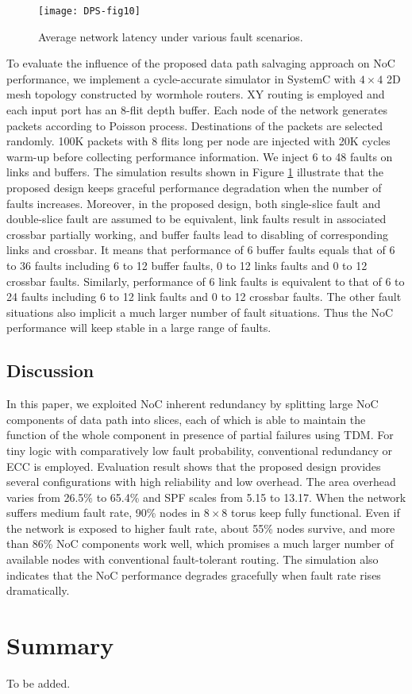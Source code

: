 \begin{figure}[h]
      \centering
        \texttt{[image: DPS-fig10]}
        \caption{Average network latency under various fault scenarios.}
        \label{fig:dps-fig10}
\end{figure}

To evaluate the influence of the proposed data path salvaging approach on NoC performance, we implement a cycle-accurate simulator in SystemC with $4 \times 4$ 2D mesh topology constructed by wormhole routers. XY routing is employed and each input port has an 8-flit depth buffer. Each node of the network generates packets according to Poisson process. Destinations of the packets are selected randomly. 100K packets with 8 flits long per node are injected with 20K cycles warm-up before collecting performance information. We inject 6 to 48 faults on links and buffers. The simulation results shown in Figure \ref{fig:dps-fig10} illustrate that the proposed design keeps graceful performance degradation when the number of faults increases. Moreover, in the proposed design, both single-slice fault and double-slice fault are assumed to be equivalent, link faults result in associated crossbar partially working, and buffer faults lead to disabling of corresponding links and crossbar. It means that performance of 6 buffer faults equals that of 6 to 36 faults including 6 to 12 buffer faults, 0 to 12 links faults and 0 to 12 crossbar faults. Similarly, performance of 6 link faults is equivalent to that of 6 to 24 faults including 6 to 12 link faults and 0 to 12 crossbar faults. The other fault situations also implicit a much larger number of fault situations. Thus the NoC performance will keep stable in a large range of faults.

\subsection{Discussion}
In this paper, we exploited NoC inherent redundancy by splitting large NoC components of data path into slices, each of which is able to maintain the function of the whole component in presence of partial failures using TDM. For tiny logic with comparatively low fault probability, conventional redundancy or ECC is employed. Evaluation result shows that the proposed design provides several configurations with high reliability and low overhead. The area overhead varies from 26.5\% to 65.4\% and SPF scales from 5.15 to 13.17. When the network suffers medium fault rate, 90\% nodes in $8 \times 8$ torus keep fully functional. Even if the network is exposed to higher fault rate, about 55\% nodes survive, and more than 86\% NoC components work well, which promises a much larger number of available nodes with conventional fault-tolerant routing. The simulation also indicates that the NoC performance degrades gracefully when fault rate rises dramatically.

\section{Summary}
To be added.





